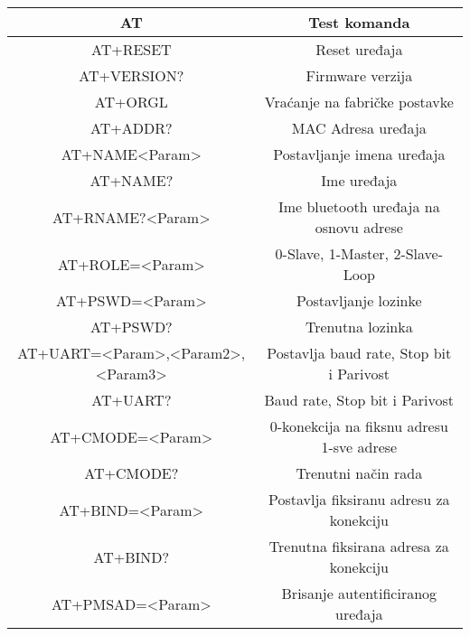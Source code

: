\documentclass[../Document.tex]{subfiles}
\begin{document}
\begin{table}[h]
    \def\arraystretch{1.5}
    \centering
    \begin{tabular}{ |c|c| }
        \hline
        AT                                & Test komanda                              \\\hline
        AT+RESET                          & Reset uređaja                             \\\hline
        AT+VERSION?                       & Firmware verzija                          \\\hline
        AT+ORGL                           & Vraćanje na fabričke postavke             \\\hline
        AT+ADDR?                          & MAC Adresa uređaja                        \\\hline
        AT+NAME<Param>                    & Postavljanje imena uređaja                \\\hline
        AT+NAME?                          & Ime uređaja                               \\\hline
        AT+RNAME?<Param>                  & Ime bluetooth uređaja na osnovu adrese    \\\hline
        AT+ROLE=<Param>                   & 0-Slave, 1-Master, 2-Slave-Loop           \\\hline
        AT+PSWD=<Param>                   & Postavljanje lozinke                      \\\hline
        AT+PSWD?                          & Trenutna lozinka                          \\\hline
        AT+UART=<Param>,<Param2>,<Param3> & Postavlja baud rate, Stop bit i Parivost  \\\hline
        AT+UART?                          & Baud rate, Stop bit i Parivost            \\\hline
        AT+CMODE=<Param>                  & 0-konekcija na fiksnu adresu 1-sve adrese \\\hline
        AT+CMODE?                         & Trenutni način rada                       \\\hline
        AT+BIND=<Param>                   & Postavlja fiksiranu adresu za konekciju   \\\hline
        AT+BIND?                          & Trenutna fiksirana adresa za konekciju    \\\hline
        AT+PMSAD=<Param>                  & Brisanje autentificiranog uređaja         \\\hline

\end{tabular}
\end{table}
\end{document}
